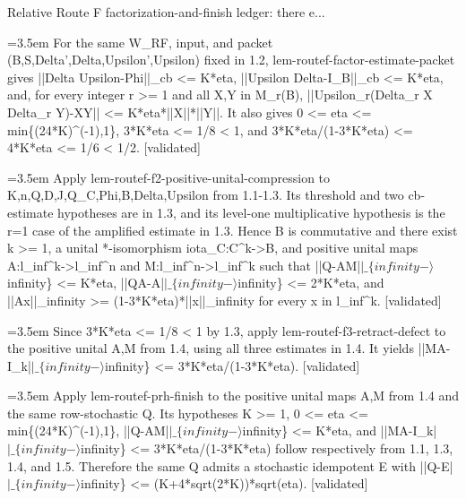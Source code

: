 \documentclass{article}
\newcommand{\step}[1]{\par\noindent\hangindent=3.5em\hangafter=1%
  \makebox[3.5em][l]{\textbf{#1.}}}
\newcommand{\steptag}[1]{\hfill{\small\textsf{[#1]}}}
\begin{document}
\begin{proofbox}{Relative Route F factorization-and-finish ledger: there e...}
\step{1.3} For the same W\_RF, input, and packet (B,S,Delta',Delta,Upsilon',Upsilon) fixed in 1.2, lem-routef-factor-estimate-packet gives ||Delta Upsilon-Phi||\_cb <= K*eta, ||Upsilon Delta-I\_B||\_cb <= K*eta, and, for every integer r >= 1 and all X,Y in M\_r(B), ||Upsilon\_r(Delta\_r X Delta\_r Y)-XY|| <= K*eta*||X||*||Y||. It also gives 0 <= eta <= min\{(24*K)\textasciicircum{}(-1),1\}, 3*K*eta <= 1/8 < 1, and 3*K*eta/(1-3*K*eta) <= 4*K*eta <= 1/6 < 1/2. \steptag{validated} \\[4pt]
\step{1.4} Apply lem-routef-f2-positive-unital-compression to K,n,Q,D,J,Q\_C,Phi,B,Delta,Upsilon from 1.1-1.3. Its threshold and two cb-estimate hypotheses are in 1.3, and its level-one multiplicative hypothesis is the r=1 case of the amplified estimate in 1.3. Hence B is commutative and there exist k >= 1, a unital *-isomorphism iota\_C:C\textasciicircum{}k->B, and positive unital maps A:l\_inf\textasciicircum{}k->l\_inf\textasciicircum{}n and M:l\_inf\textasciicircum{}n->l\_inf\textasciicircum{}k such that ||Q-AM|$|\_\{infinity-\rangle$infinity\} <= K*eta, ||QA-A|$|\_\{infinity-\rangle$infinity\} <= 2*K*eta, and ||Ax||\_infinity >= (1-3*K*eta)*||x||\_infinity for every x in l\_inf\textasciicircum{}k. \steptag{validated} \\[4pt]
\step{1.5} Since 3*K*eta <= 1/8 < 1 by 1.3, apply lem-routef-f3-retract-defect to the positive unital A,M from 1.4, using all three estimates in 1.4. It yields ||MA-I\_k|$|\_\{infinity-\rangle$infinity\} <= 3*K*eta/(1-3*K*eta). \steptag{validated} \\[4pt]
\step{1.6} Apply lem-routef-prh-finish to the positive unital maps A,M from 1.4 and the same row-stochastic Q. Its hypotheses K >= 1, 0 <= eta <= min\{(24*K)\textasciicircum{}(-1),1\}, ||Q-AM|$|\_\{infinity-\rangle$infinity\} <= K*eta, and ||MA-I\_k|$|\_\{infinity-\rangle$infinity\} <= 3*K*eta/(1-3*K*eta) follow respectively from 1.1, 1.3, 1.4, and 1.5. Therefore the same Q admits a stochastic idempotent E with ||Q-E|$|\_\{infinity-\rangle$infinity\} <= (K+4*sqrt(2*K))*sqrt(eta). \steptag{validated} \\[4pt]
\end{proofbox}
\end{document}

